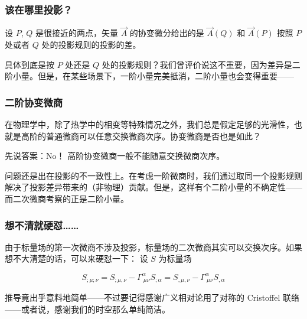 \documentclass[CJK,13pt]{beamer}
\date{}
\begin{document}
  \bch


  \begin{frame}
    \frametitle{该在哪里投影？}
    设 $P$, $Q$ 是很接近的两点，矢量 $\vec{A}$ 的协变微分给出的是 $\vec{A}(Q)$ 和 $\vec{A}(P)$ 按照 $P$ 处或者 $Q$ 处的投影规则的投影的差。


    \skiplines
    
    具体到底是按 $P$ 处还是 $Q$ 处的投影规则？我们曾评价说这不重要，因为差异是二阶小量。但是，在某些场景下，一阶小量完美抵消，二阶小量也会变得重要——

  \end{frame}


  \begin{frame}
    \frametitle{二阶协变微商}
    在物理学中，除了热学中的相变等特殊情况之外，我们总是假定足够的光滑性，也就是高阶的普通微商可以任意交换微商次序。协变微商是否也是如此？

    \skiplines

    先说答案：No！ {\blue 高阶协变微商一般不能随意交换微商次序。}

    \skiplines
    
    问题还是出在投影的不一致性上。在考虑一阶微商时，我们通过取同一个投影规则解决了投影差异带来的（非物理）贡献。但是，这样有个二阶小量的不确定性——而二次微商考察的正是二阶小量。

  \end{frame}

  \begin{frame}

    \frametitle{想不清就硬怼……}
    由于标量场的第一次微商不涉及投影，标量场的二次微商其实可以交换次序。如果想不大清楚的话，可以来硬怼一下： 设 $S$ 为标量场

    $$ S_{;\mu;\nu} = S_{;\mu,\nu}-\Gamma^\alpha_{\ \mu\nu}S_{;\alpha}  = S_{,\mu,\nu} - \Gamma^\alpha_{\ \mu\nu}S_{,\alpha} $$
    

    推导竟出乎意料地简单——不过要记得感谢广义相对论用了对称的 Cristoffel 联络——或者说，感谢我们的时空那么单纯简洁。
  \end{frame}
\end{document}

